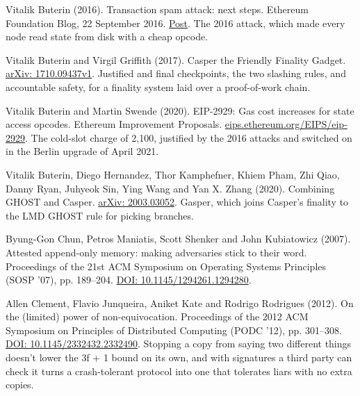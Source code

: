 \noindent Vitalik Buterin (2016). Transaction spam attack: next steps. Ethereum Foundation Blog, 22 September 2016. \href{https://blog.ethereum.org/2016/09/22/transaction-spam-attack-next-steps/}{Post}. The 2016 attack, which made every node read state from disk with a cheap opcode.
\par\medskip

\noindent Vitalik Buterin and Virgil Griffith (2017). Casper the Friendly Finality Gadget. \href{https://arxiv.org/abs/1710.09437v1}{arXiv: 1710.09437v1}. Justified and final checkpoints, the two slashing rules, and accountable safety, for a finality system laid over a proof-of-work chain.
\par\medskip

\noindent Vitalik Buterin and Martin Swende (2020). EIP-2929: Gas cost increases for state access opcodes. Ethereum Improvement Proposals. \href{https://eips.ethereum.org/EIPS/eip-2929}{eips.ethereum.org/EIPS/eip-2929}. The cold-slot charge of 2,100, justified by the 2016 attacks and switched on in the Berlin upgrade of April 2021.
\par\medskip

\noindent Vitalik Buterin, Diego Hernandez, Thor Kamphefner, Khiem Pham, Zhi Qiao, Danny Ryan, Juhyeok Sin, Ying Wang and Yan X. Zhang (2020). Combining GHOST and Casper. \href{https://arxiv.org/abs/2003.03052}{arXiv: 2003.03052}. Gasper, which joins Casper's finality to the LMD GHOST rule for picking branches.
\par\medskip

\noindent Byung-Gon Chun, Petros Maniatis, Scott Shenker and John Kubiatowicz (2007). Attested append-only memory: making adversaries stick to their word. Proceedings of the 21st ACM Symposium on Operating Systems Principles (SOSP '07), pp. 189--204. \href{https://doi.org/10.1145/1294261.1294280}{DOI: 10.1145/1294261.1294280}.
\par\medskip

\noindent Allen Clement, Flavio Junqueira, Aniket Kate and Rodrigo Rodrigues (2012). On the (limited) power of non-equivocation. Proceedings of the 2012 ACM Symposium on Principles of Distributed Computing (PODC '12), pp. 301--308. \href{https://doi.org/10.1145/2332432.2332490}{DOI: 10.1145/2332432.2332490}. Stopping a copy from saying two different things doesn't lower the 3f + 1 bound on its own, and with signatures a third party can check it turns a crash-tolerant protocol into one that tolerates liars with no extra copies.
\par\medskip

